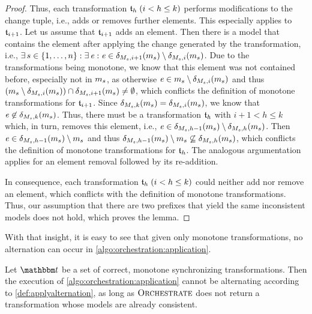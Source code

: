 \begin{proof}
    Thus, each transformation $\transformation{t}_{h} \; (i < h \leq k)$ performs modifications to the change tuple, i.e., adds or removes further elements.
    This especially applies to $\transformation{t}_{i+1}$.
    Let us assume that $\transformation{t}_{i+1}$ adds an element.
    Then there is a model that contains the element after applying the change generated by the transformation, i.e., $\exists s \in \setted{1, \dots, n} : \exists \modelelement{e} : \modelelement{e} \in \change{\metamodel{M}{s},i+1}(\model{m}{s}) \setminus \change{\metamodel{M}{s},i}(\model{m}{s})$.
    Due to the transformations being monotone, we know that this element was not contained before, especially not in $\model{m}{s}$, as otherwise $\modelelement{e} \in \model{m}{s} \setminus \change{\metamodel{M}{s},i}(\model{m}{s})$ and thus $(\model{m}{s} \setminus \change{\metamodel{M}{s},i}(\model{m}{s})) \cap \change{\metamodel{M}{s},i+1}(\model{m}{s}) \neq \emptyset$, which conflicts the definition of monotone transformations for $\transformation{t}_{i+1}$.
    Since $\change{\metamodel{M}{s},k}(\model{m}{s}) = \change{\metamodel{M}{s},i}(\model{m}{s})$, we know that $\modelelement{e} \not\in \change{\metamodel{M}{s},k}(\model{m}{s})$.
    Thus, there must be a transformation $\transformation{t}_{h}$ with $i+1 < h \leq k$ which, in turn, removes this element, i.e., $\modelelement{e} \in \change{\metamodel{M}{s},h-1}(\model{m}{s}) \setminus \change{\metamodel{M}{s},h}(\model{m}{s})$.
    Then $\modelelement{e} \in \change{\metamodel{M}{s},h-1}(\model{m}{s}) \setminus \model{m}{s}$ and thus $\change{\metamodel{M}{s},h-1}(\model{m}{s}) \setminus \model{m}{s} \not\subseteq \change{\metamodel{M}{s},h}(\model{m}{s})$, which conflicts the definition of monotone transformations for $\transformation{t}_{h}$.
    The analogous argumentation applies for an element removal followed by its re-addition.

    In consequence, each transformation $\transformation{t}_{h} \; (i < h \leq k)$ could neither add nor remove an element, which conflicts with the definition of monotone transformations.
    Thus, our assumption that there are two prefixes that yield the same inconsistent models does not hold, which proves the lemma.
\end{proof}

With that insight, it is easy to see that given only monotone transformations, no alternation can occur in \autoref{algo:orchestration:application}.
\begin{theorem}
    Let $\transformationset{T}$ be a set of correct, monotone synchronizing transformations.
    Then the execution of \autoref{algo:orchestration:application} cannot be alternating according to \autoref{def:applyalternation}, as long as $\textsc{Orchestrate}$ does not return a transformation whose models are already consistent.
\end{theorem}

